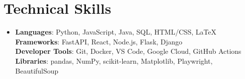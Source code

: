 \documentclass[letterpaper,11pt]{article}
\newcommand{\resumeSubHeadingListStart}{\begin{itemize}[leftmargin=0.15in, label={}]}
\newcommand{\resumeSubHeadingListEnd}{\end{itemize}}
\begin{document}
\section{Technical Skills}
 \resumeSubHeadingListStart
    \item{
     \textbf{Languages}{: Python, JavaScript, Java, SQL, HTML/CSS, LaTeX} \\
     \textbf{Frameworks}{: FastAPI, React, Node.js, Flask, Django} \\
     \textbf{Developer Tools}{: Git, Docker, VS Code, Google Cloud, GitHub Actions} \\
     \textbf{Libraries}{: pandas, NumPy, scikit-learn, Matplotlib, Playwright, BeautifulSoup}
    }
 \resumeSubHeadingListEnd

\end{document}
